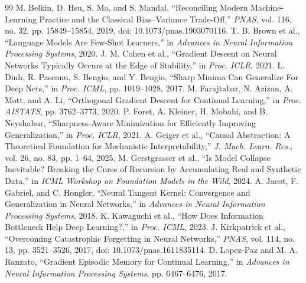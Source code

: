 \documentclass{article}
\begin{document}
\begin{thebibliography}{99}
 M. Belkin, D. Hsu, S. Ma, and S. Mandal, ``Reconciling Modern Machine-Learning Practice and the Classical Bias--Variance Trade-Off,'' \emph{PNAS}, vol. 116, no. 32, pp. 15849--15854, 2019, doi: 10.1073/pnas.1903070116.
 T. B. Brown et al., ``Language Models Are Few-Shot Learners,'' in \emph{Advances in Neural Information Processing Systems}, 2020.
 J. M. Cohen et al., ``Gradient Descent on Neural Networks Typically Occurs at the Edge of Stability,'' in \emph{Proc. ICLR}, 2021.
 L. Dinh, R. Pascanu, S. Bengio, and Y. Bengio, ``Sharp Minima Can Generalize For Deep Nets,'' in \emph{Proc. ICML}, pp. 1019--1028, 2017.
 M. Farajtabar, N. Azizan, A. Mott, and A. Li, ``Orthogonal Gradient Descent for Continual Learning,'' in \emph{Proc. AISTATS}, pp. 3762--3773, 2020.
 P. Foret, A. Kleiner, H. Mobahi, and B. Neyshabur, ``Sharpness-Aware Minimization for Efficiently Improving Generalization,'' in \emph{Proc. ICLR}, 2021.
 A. Geiger et al., ``Causal Abstraction: A Theoretical Foundation for Mechanistic Interpretability,'' \emph{J. Mach. Learn. Res.}, vol. 26, no. 83, pp. 1--64, 2025.
 M. Gerstgrasser et al., ``Is Model Collapse Inevitable? Breaking the Curse of Recursion by Accumulating Real and Synthetic Data,'' in \emph{ICML Workshop on Foundation Models in the Wild}, 2024.
 A. Jacot, F. Gabriel, and C. Hongler, ``Neural Tangent Kernel: Convergence and Generalization in Neural Networks,'' in \emph{Advances in Neural Information Processing Systems}, 2018.
 K. Kawaguchi et al., ``How Does Information Bottleneck Help Deep Learning?,'' in \emph{Proc. ICML}, 2023.
 J. Kirkpatrick et al., ``Overcoming Catastrophic Forgetting in Neural Networks,'' \emph{PNAS}, vol. 114, no. 13, pp. 3521--3526, 2017, doi: 10.1073/pnas.1611835114.
 D. Lopez-Paz and M. A. Ranzato, ``Gradient Episodic Memory for Continual Learning,'' in \emph{Advances in Neural Information Processing Systems}, pp. 6467--6476, 2017.

\end{thebibliography}
\end{document}
